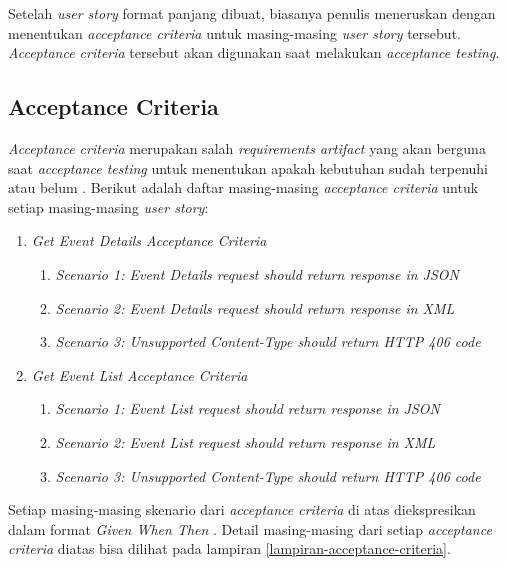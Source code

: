 \documentclass[a4paper, 12pt, oneside]{report}
\begin{document}
\onehalfspacing Setelah \textit{user story} format panjang dibuat, biasanya penulis meneruskan dengan menentukan \textit{acceptance criteria} untuk masing-masing \textit{user story} tersebut. \textit{Acceptance criteria} tersebut akan digunakan saat melakukan \textit{acceptance testing}.

\subsection{Acceptance Criteria}

\onehalfspacing \textit{Acceptance criteria} merupakan salah \textit{requirements artifact} yang akan berguna saat \textit{acceptance testing} untuk menentukan apakah kebutuhan sudah terpenuhi atau belum \cite{acceptance-testing-wikipedia}. Berikut adalah daftar masing-masing \textit{acceptance criteria} untuk setiap masing-masing \textit{user story}:
\begin{enumerate}
  \item \textit{Get Event Details Acceptance Criteria}
    \begin{enumerate}
      \item \textit{Scenario 1: Event Details request should return response in JSON}
      \item \textit{Scenario 2: Event Details request should return response in XML}
      \item \textit{Scenario 3: Unsupported Content-Type should return HTTP 406 code}
    \end{enumerate}
  \item \textit{Get Event List Acceptance Criteria}
    \begin{enumerate}
      \item \textit{Scenario 1: Event List request should return response in JSON}
      \item \textit{Scenario 2: Event List request should return response in XML}
      \item \textit{Scenario 3: Unsupported Content-Type should return HTTP 406 code}
    \end{enumerate}
\end{enumerate}

\onehalfspacing Setiap masing-masing skenario dari \textit{acceptance criteria} di atas diekspresikan dalam format \textit{Given When Then} \cite{introducing-bdd}\cite{whats-in-story}. Detail masing-masing dari setiap \textit{acceptance criteria} diatas bisa dilihat pada lampiran \ref{lampiran-acceptance-criteria}.
\end{document}
